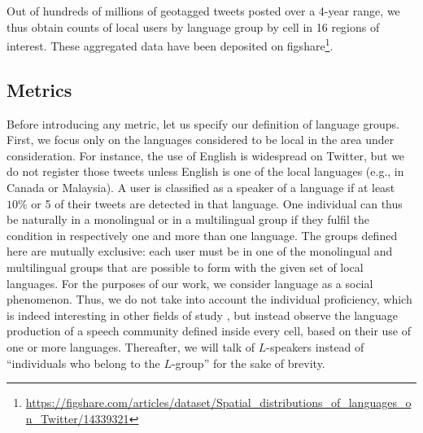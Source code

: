 \documentclass[../thesis.tex]{subfiles}
\begin{document}
Out of hundreds of millions of geotagged tweets posted over a 4-year range, we thus
obtain counts of local users by language group by cell in 16 regions of interest. These
aggregated data have been deposited on
figshare\footnote{\url{https://figshare.com/articles/dataset/Spatial_distributions_of_languages_on_Twitter/14339321}}.



\subsection{Metrics}
Before introducing any metric, let us specify our definition of language groups. First,
we focus only on the languages considered to be local in the area under consideration.
For instance, the use of English is widespread on Twitter, but we do not register those
tweets unless English is one of the local languages (e.g., in Canada or Malaysia). A
user is classified as a speaker of a language if at least $10\%$ or 5 of their tweets
are detected in that language. One individual can thus be naturally in a monolingual or
in a multilingual group if they fulfil the condition in respectively one and more than
one language. The groups defined here are mutually exclusive: each user must be in one
of the monolingual and multilingual groups that are possible to form with the given set
of local languages. For the purposes of our work, we consider language as a social
phenomenon. Thus, we do not take into account the individual proficiency, which is
indeed interesting in other fields of study \cite{BakerFoundationsBilingual1997}, but
instead observe the language production of a speech community defined inside every cell,
based on their use of one or more languages. Thereafter, we will talk of $L$-speakers
instead of ``individuals who belong to the $L$-group'' for the sake of brevity.
\end{document}

